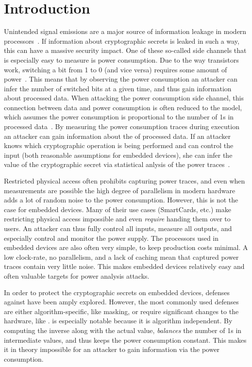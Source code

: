 \chapter{Introduction}
Unintended signal emissions are a major source of information leakage in modern processors~\cite{coron2000statistics}.
If information about cryptographic secrets is leaked in such a way, this can have a massive security impact.
One of these so-called side channels that is especially easy to measure is power consumption.
Due to the way transistors work, switching a bit from 1 to 0 (and vice versa) requires some amount of power~\cite{kocher1998introduction}.
This means that by observing the power consumption an attacker can infer the number of switched bits at a given time, and thus gain information about processed data.
When attacking the power consumption side channel, this connection between data and power consumption is often reduced to the \hammingw{} model, which assumes the power consumption is proportional to the number of 1s in processed data~\cite{brier2004correlation}.
By measuring the power consumption traces during execution an attacker can gain information about the \hammingw{} of processed data.
If an attacker knows which cryptographic operation is being performed and can control the input (both reasonable assumptions for embedded devices), she can infer the value of the cryptographic secret via statistical anlysis of the power traces~\cite{brier2004correlation}.

Restricted physical access often prohibits capturing power traces, and even when measurements are possible the high degree of parallelism in modern hardware adds a lot of random noise to the power consumption.
However, this is not the case for embedded devices.
Many of their use cases (SmartCards, etc.) make restricting physical access impossible and even \emph{require} handing them over to users.
An attacker can thus fully control all inputs, measure all outputs, and especially control and monitor the power supply.
The processors used in embedded devices are also often very simple, to keep production costs minimal.
A low clock-rate, no parallelism, and a lack of caching mean that captured power traces contain very little noise.
This makes embedded devices relatively easy and often valuable targets for power analysis attacks.

In order to protect the cryptographic secrets on embedded devices, defenses against \poweranalysis{} have been amply explored.
However, the most commonly used defenses are either algorithm-specific, like masking, or require significant changes to the hardware, like \dual{}\cite{sokolov2005design}.
\Dual{} is especially notable because it is algorithm independent.
By computing the inverse along with the actual value, \dual{} \emph{balances} the number of 1s in intermediate values, and thus keeps the power consumption constant.
This makes it in theory impossible for an attacker to gain information via the power consumption.

